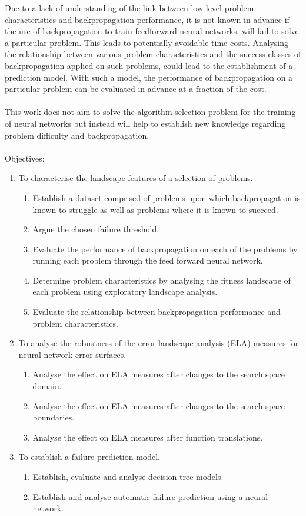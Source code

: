 \documentclass[runningheads,a4paper]{llncs}
\begin{document}
Due to a lack of understanding of the link between low level problem characteristics and backpropagation performance, 
it is not known in advance if the use of backpropagation to train feedforward neural networks, will fail to solve a particular problem. 
This leads to potentially avoidable time costs.
Analysing the relationship between various problem characteristics and the success classes of backpropagation applied on such problems, 
could lead to the establishment of a prediction model. With such a model, the performance of backpropagation on a particular problem can be 
evaluated in advance at a fraction of the cost.
\\\\
This work does not aim to solve the algorithm selection problem for the training of neural networks but instead will help to establish new knowledge 
regarding problem difficulty and backpropagation.
\\\\
Objectives:
\begin{enumerate}
 \item To characterise the landscape features of a selection of problems.
 \begin{enumerate}
  \item Establish a dataset comprised of problems upon which backpropagation is known to struggle as well as problems where it is known to succeed.
  \item Argue the chosen failure threshold. 
  \item Evaluate the performance of backpropagation on each of the problems by running each problem through the feed forward neural network.
  \item Determine problem characteristics by analysing the fitness landscape of each problem using exploratory landscape analysis.
  \item Evaluate the relationship between backpropagation performance and problem characteristics.
 \end{enumerate}
 
  \item To analyse the robustness of the error landscape analysis (ELA) measures for neural network error surfaces.
 \begin{enumerate}
  \item Analyse the effect on ELA measures after changes to the search space domain.
  \item Analyse the effect on ELA measures after changes to the search space boundaries.
  \item Analyse the effect on ELA measures after function translations.
 \end{enumerate}
 
 \item To establish a failure prediction model.
 \begin{enumerate}
  \item Establish, evaluate and analyse decision tree models.
  \item Establish and analyse automatic failure prediction using a neural network.
 \end{enumerate}
 
\end{enumerate}
\end{document}
